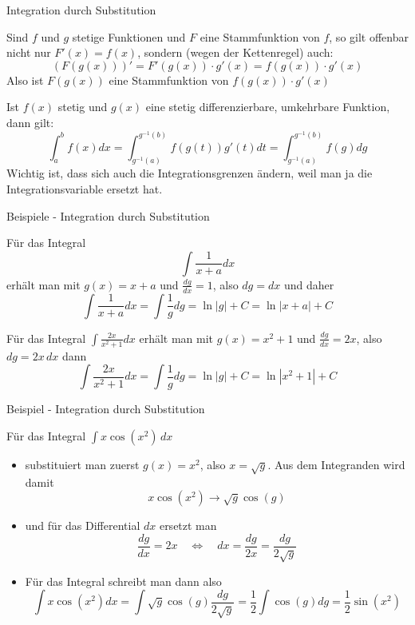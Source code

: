 \begin{frame}{Integration durch Substitution}
\begin{bemerkung}
	Sind $f$ und $g$ stetige Funktionen und $F$ eine Stammfunktion von $f$, so gilt offenbar nicht nur $F'(x)=f(x)$, sondern (wegen der Kettenregel) auch:
	\[
		\left(F(g(x))\right)' = F'(g(x))\cdot g'(x) = f(g(x))\cdot g'(x)
	\]
	Also ist $F(g(x))$ eine Stammfunktion von $f(g(x))\cdot g'(x)$
\end{bemerkung}
\begin{theorem}
	Ist $f(x)$ stetig und $g(x)$ eine stetig differenzierbare, umkehrbare Funktion, dann gilt:
	\[
		\int_{a}^{b} f(x) dx = \int_{g^{-1}(a)}^{g^{-1}(b)} f(g(t)) g'(t) dt = \int_{g^{-1}(a)}^{g^{-1}(b)} f(g) dg
	\]
	Wichtig ist, dass sich auch die Integrationsgrenzen ändern, weil man ja die Integrationsvariable ersetzt hat.
\end{theorem}
\end{frame}


\begin{frame}{Beispiele - Integration durch Substitution}
\begin{example}
Für das Integral
\[
	\int \frac{1}{x+a}dx
\]	
erhält man mit $g(x)=x+a$ und $\frac{dg}{dx}=1$, also $dg=dx$ und daher
\[
\int \frac{1}{x+a}dx = \int \frac{1}{g} dg = \ln |g| + C= \ln |x+a| +C
\]
\end{example}
\begin{example}
	Für das Integral $\int \frac{2x}{x^2+1} dx$ erhält man mit $g(x)=x^2+1$ und $\frac{dg}{dx}= 2x$, also $dg = 2x\,dx$ dann
	\[
		\int \frac{2x}{x^2+1} dx = \int \frac{1}{g}dg = \ln |g| + C = \ln |x^2+1| +C
	\]
\end{example}
\end{frame}

\begin{frame}{Beispiel - Integration durch Substitution}
\begin{example}
	Für das Integral $\int x \cos (x^{2})\,dx$
	\begin{itemize}
		\item substituiert man zuerst $g(x)=x^{2}$, also $x=\sqrt{g}$. Aus dem Integranden wird damit 
			\[
				x \cos (x^{2}) \rightarrow \sqrt{g} \cos (g)
			\]
			\item und für das Differential $dx$ ersetzt man 
			\[
				\frac{dg}{dx} = 2x \quad \Leftrightarrow \quad dx = \frac{dg}{2x} = \frac{dg}{2\sqrt{g}} 
			\]
		\item Für das Integral schreibt man dann also
		\[
			\int x \cos (x^{2}) dx = \int \sqrt{g} \cos (g) \frac{dg}{2 \sqrt{g}} = \frac{1}{2}\int \cos (g) dg = \frac{1}{2}\sin(x^{2})
		\]
	\end{itemize}
\end{example}
\end{frame}


